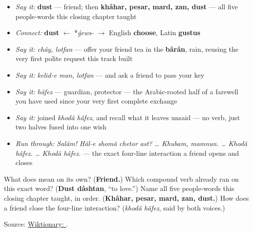 \begin{itemize}
\raggedright
  \item \emph{Say it:} \textbf{dust} — friend; then \textbf{khâhar, pesar, mard, zan, dust} — all five people-words this closing chapter taught
  \item \emph{Connect:} \textbf{dust} $\leftarrow$ *\emph{ǵews-} $\to$ English \textbf{choose}, Latin \textbf{gustus}
  \item \emph{Say it:} \emph{chây, lotfan} — offer your friend tea in the \textbf{bârân}, rain, reusing the very first polite request this track built
  \item \emph{Say it:} \emph{kelid-e man, lotfan} — and ask a friend to pass your key
  \item \emph{Say it:} \emph{hâfez} — guardian, protector — the Arabic-rooted half of a farewell you have used since your very first complete exchange
  \item \emph{Say it:} joined \emph{khodâ hâfez}, and recall what it leaves unsaid — no verb, just two halves fused into one wish
  \item \emph{Run through:} \emph{Salâm! Hâl-e shomâ chetor ast? … Khubam, mamnun. … Khodâ hâfez. … Khodâ hâfez.} — the exact four-line interaction a friend opens and closes
\end{itemize}

\begin{tcolorbox}[breakable,colback=teal!4,colframe=teal!35!black,title={Before you move on}]
What does \textbf{} mean on its own? (\textbf{Friend.}) Which compound verb already ran on this exact word? (\textbf{Dust dâshtan}, \textquotedblleft{}to love.\textquotedblright{}) Name all five people-words this closing chapter taught, in order. (\textbf{Khâhar, pesar, mard, zan, dust.}) How does a friend close the four-line interaction? (\emph{khodâ hâfez}, said by both voices.)

Source: \href{https://en.wiktionary.org/wiki/\%D8\%AF\%D9\%88\%D8\%B3\%D8\%AA}{Wiktionary: }.
\end{tcolorbox}
